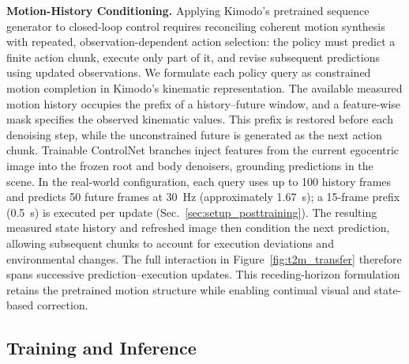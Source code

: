 \begin{samepage}
\textbf{Motion-History Conditioning.} Applying Kimodo's pretrained sequence generator to closed-loop control requires reconciling coherent motion synthesis with repeated, observation-dependent action selection: the policy must predict a finite action chunk, execute only part of it, and revise subsequent predictions using updated observations. We formulate each policy query as constrained motion completion in Kimodo's kinematic representation. The available measured motion history occupies the prefix of a history--future window, and a feature-wise mask specifies the observed kinematic values. This prefix is restored before each denoising step, while the unconstrained future is generated as the next action chunk. Trainable ControlNet branches inject features from the current egocentric image into the frozen root and body denoisers, grounding predictions in the scene. In the real-world configuration, each query uses up to 100 history frames and predicts 50 future frames at 30~Hz (approximately 1.67~s); a 15-frame prefix (0.5~s) is executed per update (Sec.~\ref{sec:setup_posttraining}). The resulting measured state history and refreshed image then condition the next prediction, allowing subsequent chunks to account for execution deviations and environmental changes. The full interaction in Figure~\ref{fig:t2m_transfer} therefore spans successive prediction--execution updates. This receding-horizon formulation retains the pretrained motion structure while enabling continual visual and state-based correction.\par
\end{samepage}

\subsection{Training and Inference}
\label{sec:training_inference}


